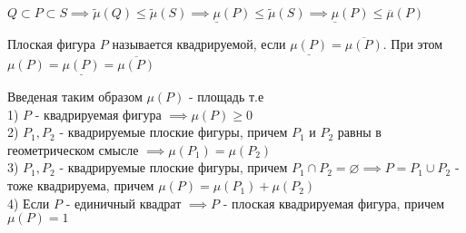 \documentclass[../main.tex]{subfiles}
\begin{document}
$Q\subset P \subset S \implies \tilde{\mu}(Q)\leqslant \tilde{\mu}(S)\implies \underline{\mu}(P)\leqslant \tilde{\mu}(S)\implies \underline{\mu}(P)\leqslant \overline{\mu}(P)$

\begin{definition}
    Плоская фигура $P$ называется квадрируемой, если $\underline{\mu(P)}=\overline{\mu(P)}.$ При этом $\mu(P)=\underline{\mu(P)}=\overline{\mu(P)}$
\end{definition}

\begin{theorem}
    Введеная таким образом $\mu(P)$ - площадь т.е 
    \\1) $P$ - квадрируемая фигура $\implies \mu (P)\geqslant 0$
    \\2) $P_{1},P_{2}$ - квадрируемые плоские фигуры, причем $P_{1}$ и $P_{2}$ равны в геометрическом смысле $\implies \mu(P_{1})=\mu(P_{2}) $
    \\3) $P_{1},P_{2}$ - квадрируемые плоские фигуры, причем $P_{1} \cap P_{2} = \varnothing \implies P=P_{1}\cup P_{2}$ - тоже квадрируема, причем $\mu(P)=\mu(P_{1})+\mu(P_{2})$
    \\4) Если $P$ - единичный квадрат $\implies P$ - плоская квадрируемая фигура, причем $\mu(P)=1$ 

\end{theorem}
\end{document}
